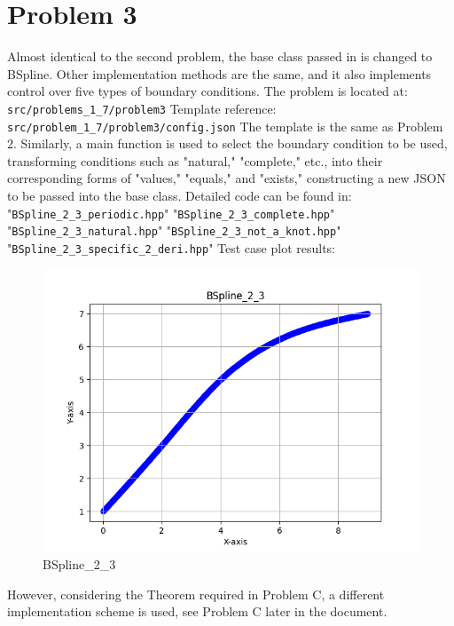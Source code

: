 \documentclass[a4paper]{article}
\begin{document}
\section*{Problem 3}
Almost identical to the second problem, the base class passed in is changed to BSpline. Other implementation methods are the same, and it also implements control over five types of boundary conditions.
The problem is located at: \texttt{src/problems\_1\_7/problem3}
Template reference: \texttt{src/problem\_1\_7/problem3/config.json}
The template is the same as Problem 2.
Similarly, a main function is used to select the boundary condition to be used, transforming conditions such as "natural," "complete," etc., into their corresponding forms of "values," "equals," and "exists," constructing a new JSON to be passed into the base class.
Detailed code can be found in:
"\texttt{BSpline\_2\_3\_periodic.hpp}"
"\texttt{BSpline\_2\_3\_complete.hpp}"
"\texttt{BSpline\_2\_3\_natural.hpp}"
"\texttt{BSpline\_2\_3\_not\_a\_knot.hpp}"
"\texttt{BSpline\_2\_3\_specific\_2\_deri.hpp}"
Test case plot results:
\begin{figure}[H] 
    \centering
    \includegraphics{../figure/BSpline_2_3.png} 
    \caption{BSpline\_2\_3} 
\end{figure}
However, considering the Theorem required in Problem C, a different implementation scheme is used, see Problem C later in the document.
\end{document}
